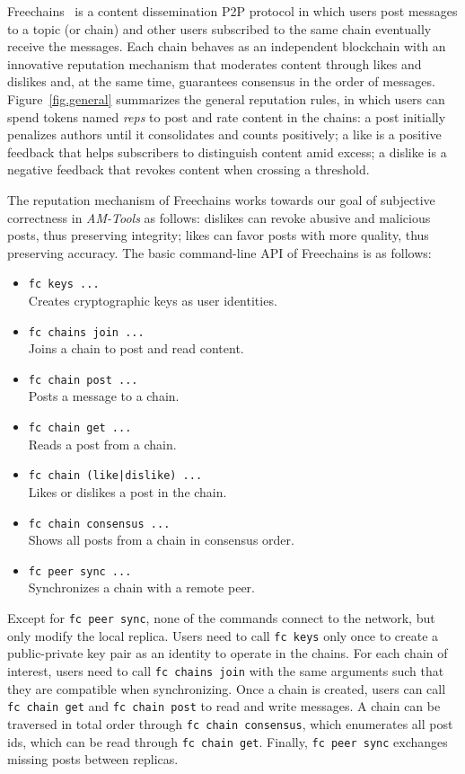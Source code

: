 \documentclass[12pt]{article}
\newcommand{\AMT}      {\emph{AM-Tools}\xspace}
\newcommand{\code}[1]  {\texttt{\footnotesize{#1}}}
\begin{document}
Freechains~\cite{fcs.sbseg20} is a content dissemination P2P protocol in which
users post messages to a topic (or chain) and other users subscribed to the
same chain eventually receive the messages.
%
Each chain behaves as an independent blockchain with an innovative reputation
mechanism that moderates content through likes and dislikes and, at the same
time, guarantees consensus in the order of messages.
%
Figure~\ref{fig.general} summarizes the general reputation rules, in which
users can spend tokens named \emph{reps} to post and rate content in the
chains:
    a post initially penalizes authors until it consolidates and counts positively;
    a like is a positive feedback that helps subscribers to distinguish content amid excess;
    a dislike is a negative feedback that revokes content when crossing a threshold.

The reputation mechanism of Freechains works towards our goal of subjective
correctness in \AMT as follows:
    dislikes can revoke abusive and malicious posts, thus preserving integrity;
    likes can favor posts with more quality, thus preserving accuracy.
%
The basic command-line API of Freechains is as follows:

\begin{itemize}
\item \code{fc keys ...} \\
    Creates cryptographic keys as user identities.
\item \code{fc chains join ...} \\
    Joins a chain to post and read content.
\item \code{fc chain post ...} \\
    Posts a message to a chain.
\item \code{fc chain get ...} \\
    Reads a post from a chain.
\item \code{fc chain (like|dislike) ...} \\
    Likes or dislikes a post in the chain.
\item \code{fc chain consensus ...} \\
    Shows all posts from a chain in consensus order.
\item \code{fc peer sync ...} \\
    Synchronizes a chain with a remote peer.
\end{itemize}

Except for \code{fc~peer~sync}, none of the commands connect to the network,
but only modify the local replica.
%
Users need to call \code{fc~keys} only once to create a public-private key pair
as an identity to operate in the chains.
%
For each chain of interest, users need to call \code{fc~chains~join} with the
same arguments such that they are compatible when synchronizing.
%
Once a chain is created, users can call \code{fc~chain~get} and
\code{fc~chain~post} to read and write messages.
%
A chain can be traversed in total order through \code{fc~chain~consensus},
which enumerates all post ids, which can be read through \code{fc~chain~get}.
%
Finally, \code{fc~peer~sync} exchanges missing posts between replicas.
\end{document}
